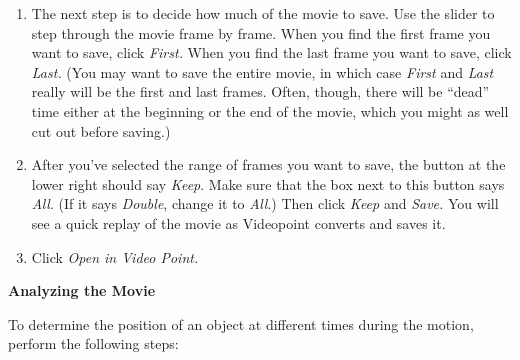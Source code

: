 \begin{enumerate}
\item The next step is to decide how much of the movie to save.
Use the slider to step through the movie frame by frame.  When you
find the first frame you want to save, click \textit{First.}  When you find
the last frame you want to save, click \textit{Last.}  
(You may want to save the 
entire movie, in which case \textit{First} and \textit{Last} really will be the
first and last frames.  Often, though, there will be ``dead'' time
either at the beginning or the end of the movie, which you might
as well cut out before saving.)

\item After you've selected the range of frames you want to save, the button
at the lower right should say \textit{Keep}.  Make sure that the 
box next to this button says \textit{All}.  (If it says \textit{Double},
change it to \textit{All}.)
Then click \textit{Keep}
and \textit{Save.}  You will see a quick replay of the movie as Videopoint
converts and saves it.

\item Click \textit{Open in Video Point.}

\end{enumerate}
\textbf{Analyzing the Movie} 

To determine the position of an object at different times during the
motion, perform the following steps:

